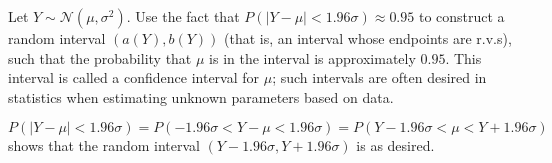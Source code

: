 

\setcounter{theorem}{27}
\begin{exercise}[BH.5.28] Let $Y \sim \mathcal{N}\left(\mu, \sigma^2\right)$. Use the fact that $P(|Y-\mu|<1.96 \sigma) \approx 0.95$ to construct a random interval $(a(Y), b(Y))$ (that is, an interval whose endpoints are r.v.s), such that the probability that $\mu$ is in the interval is approximately $0.95$. This interval is called a confidence interval for $\mu$; such intervals are often desired in statistics when estimating unknown parameters based on data.
\begin{solution}
    $$P(|Y-\mu|<1.96 \sigma)=P(-1.96 \sigma<Y-\mu<1.96 \sigma)=P(Y-1.96 \sigma<\mu<Y+1.96 \sigma)
    $$
    shows that the random interval $(Y-1.96 \sigma, Y+1.96 \sigma)$ is as desired.
\end{solution}
\end{exercise}


